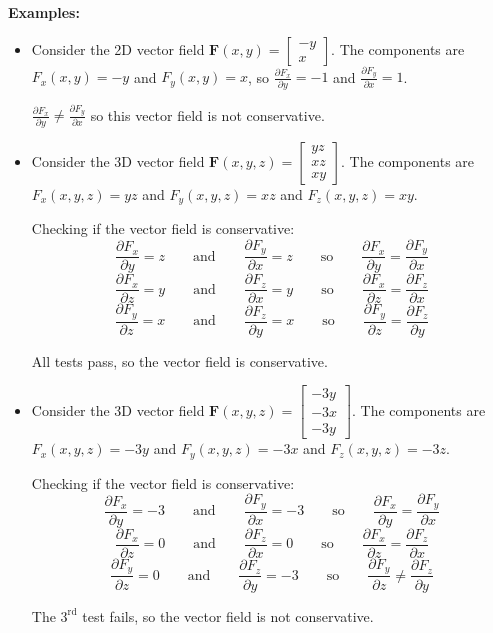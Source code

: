 \documentclass{article}
\begin{document}
\textbf{Examples:} 
\begin{itemize}
\item Consider the 2D vector field \(\mathbf{F}(x,y) = \begin{bmatrix} -y \\ x \end{bmatrix}\). The components are \(F_x(x,y) = -y\) and \(F_y(x,y) = x\), so \(\frac{\partial F_x}{\partial y} = -1\) and \(\frac{\partial F_y}{\partial x} = 1\). 

\(\frac{\partial F_x}{\partial y} \neq \frac{\partial F_y}{\partial x}\) so this vector field is not conservative.  
\item Consider the 3D vector field \(\mathbf{F}(x,y,z) = \begin{bmatrix} yz \\ xz \\ xy \end{bmatrix}\). The components are \(F_x(x,y,z) = yz\) and \(F_y(x,y,z) = xz\) and \(F_z(x,y,z) = xy\). 

Checking if the vector field is conservative:
\[\frac{\partial F_x}{\partial y} = z \quad\quad\text{and}\quad\quad \frac{\partial F_y}{\partial x} = z \quad\quad\text{so}\quad\quad \frac{\partial F_x}{\partial y} = \frac{\partial F_y}{\partial x}\]
\[\frac{\partial F_x}{\partial z} = y \quad\quad\text{and}\quad\quad \frac{\partial F_z}{\partial x} = y \quad\quad\text{so}\quad\quad \frac{\partial F_x}{\partial z} = \frac{\partial F_z}{\partial x}\]
\[\frac{\partial F_y}{\partial z} = x \quad\quad\text{and}\quad\quad \frac{\partial F_z}{\partial y} = x \quad\quad\text{so}\quad\quad \frac{\partial F_y}{\partial z} = \frac{\partial F_z}{\partial y}\]

All tests pass, so the vector field is conservative.
\item Consider the 3D vector field \(\mathbf{F}(x,y,z) = \begin{bmatrix} -3y \\ -3x \\ -3y \end{bmatrix}\). The components are \(F_x(x,y,z) = -3y\) and \(F_y(x,y,z) = -3x\) and \(F_z(x,y,z) = -3z\). 

Checking if the vector field is conservative:
\[\frac{\partial F_x}{\partial y} = -3 \quad\quad\text{and}\quad\quad \frac{\partial F_y}{\partial x} = -3 \quad\quad\text{so}\quad\quad \frac{\partial F_x}{\partial y} = \frac{\partial F_y}{\partial x}\]
\[\frac{\partial F_x}{\partial z} = 0 \quad\quad\text{and}\quad\quad \frac{\partial F_z}{\partial x} = 0 \quad\quad\text{so}\quad\quad \frac{\partial F_x}{\partial z} = \frac{\partial F_z}{\partial x}\]
\[\frac{\partial F_y}{\partial z} = 0 \quad\quad\text{and}\quad\quad \frac{\partial F_z}{\partial y} = -3 \quad\quad\text{so}\quad\quad \frac{\partial F_y}{\partial z} \neq \frac{\partial F_z}{\partial y}\]

The \(3^{\text{rd}}\) test fails, so the vector field is not conservative.
\end{itemize}
\end{document}

